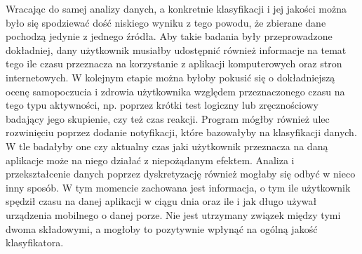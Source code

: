 \documentclass[a4paper,twoside,12pt]{book}
\begin{document}
Wracając do samej analizy danych, a konkretnie klasyfikacji i jej jakości można było się spodziewać dość niskiego wyniku z tego powodu, że zbierane dane pochodzą jedynie z jednego źródła. Aby takie badania były przeprowadzone dokładniej, dany użytkownik musiałby udostępnić również informacje na temat tego ile czasu przeznacza na korzystanie z aplikacji komputerowych oraz stron internetowych. W kolejnym etapie można byłoby pokusić się o dokładniejszą ocenę samopoczucia i zdrowia użytkownika względem przeznaczonego czasu na tego typu aktywności, np. poprzez krótki test logiczny lub zręcznościowy badający jego skupienie, czy też czas reakcji. Program mógłby również ulec rozwinięciu poprzez dodanie notyfikacji, które bazowałyby na klasyfikacji danych. W tle badałyby one czy aktualny czas jaki użytkownik przeznacza na daną aplikacje może na niego działać z niepożądanym efektem. Analiza i przekształcenie danych poprzez dyskretyzację również mogłaby się odbyć w nieco inny sposób. W tym momencie zachowana jest informacja, o tym ile  użytkownik spędził czasu na danej aplikacji w ciągu dnia oraz ile i jak długo używał urządzenia mobilnego o danej porze. Nie jest utrzymany związek między tymi dwoma składowymi, a mogłoby to pozytywnie wpłynąć na ogólną jakość klasyfikatora. 
\end{document}
